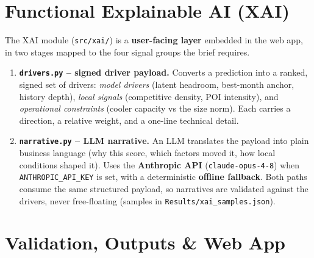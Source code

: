 \documentclass[10pt,a4paper]{article}
\begin{document}
\section{Functional Explainable AI (XAI)}
The XAI module (\texttt{src/xai/}) is a \textbf{user-facing layer} embedded in the
web app, in two stages mapped to the four signal groups the brief requires.

\begin{enumerate}[leftmargin=1.3em,itemsep=1pt]
\item \textbf{\texttt{drivers.py} -- signed driver payload.} Converts a prediction
into a ranked, signed set of drivers: \emph{model drivers} (latent headroom,
best-month anchor, history depth), \emph{local signals} (competitive density, POI
intensity), and \emph{operational constraints} (cooler capacity vs the size norm).
Each carries a direction, a relative weight, and a one-line technical detail.
\item \textbf{\texttt{narrative.py} -- LLM narrative.} An LLM translates the
payload into plain business language (why this score, which factors moved it, how
local conditions shaped it). Uses the \textbf{Anthropic API}
(\texttt{claude-opus-4-8}) when \texttt{ANTHROPIC\_API\_KEY} is set, with a
deterministic \textbf{offline fallback}. Both paths consume the same structured
payload, so narratives are validated against the drivers, never free-floating
(samples in \texttt{Results/xai\_samples.json}).
\end{enumerate}

\section{Validation, Outputs \& Web App}
\end{document}
